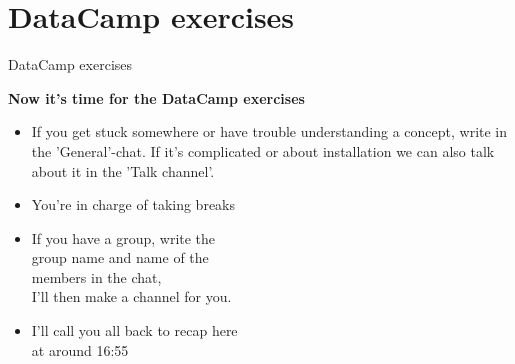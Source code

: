 \documentclass[10pt,danish,t,10pt]{beamer}
\begin{document}
\section{DataCamp exercises}
\begin{frame}{DataCamp exercises}

    \textbf{Now it's time for the DataCamp exercises}
    \begin{itemize}
        \item If you get stuck somewhere or have trouble understanding a concept, write in the 'General'-chat. If it's complicated or about installation we can also talk about it in the 'Talk channel'.
        \item You're in charge of taking breaks
        \item If you have a group, write the \\
        group name and name of the \\ 
        members in the chat,\\
        I'll then make a channel for you.
        \item I'll call you all back to recap here\\ 
        at around 16:55
    \end{itemize}

\end{frame}
\end{document}
